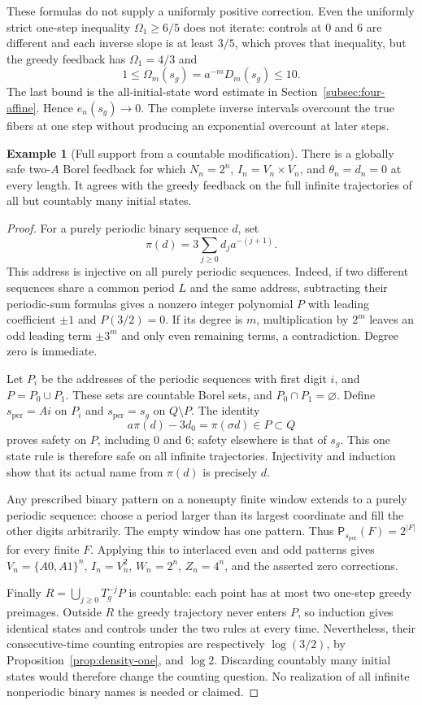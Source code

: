 \documentclass[11pt,reqno]{amsart}
\numberwithin{equation}{section}
\theoremstyle{definition}
\newtheorem{example}[theorem]{Example}
\theoremstyle{definition}
\newcommand{\Patt}{\mathsf P}
\begin{document}
These formulas do not supply a uniformly positive correction.
Even the uniformly strict one-step inequality
$\Omega_1\ge6/5$ does not iterate: controls at $0$ and $6$
are different and each inverse slope is at least $3/5$, which
proves that inequality, but the greedy feedback has
$\Omega_1=4/3$ and
\[
 1\le\Omega_m(s_g)=a^{-m}D_m(s_g)\le10.
\]
The last bound is the all-initial-state word estimate in
Section~\ref{subsec:four-affine}. Hence $e_n(s_g)\to0$.
The complete inverse intervals overcount the true fibers at one
step without producing an exponential overcount at later steps.

\begin{example}[Full support from a countable modification]
\label{ex:periodic-support}
There is a globally safe two-$A$ Borel feedback for which
$N_n=2^n$, $I_n=V_n\times V_n$, and $\theta_n=d_n=0$ at
every length. It agrees with the greedy feedback on the full
infinite trajectories of all but countably many initial states.
\end{example}
\begin{proof}
For a purely periodic binary sequence $d$, set
\[
 \pi(d)=3\sum_{j\ge0}d_ja^{-(j+1)}.
\]
This address is injective on all purely periodic sequences.
Indeed, if two different sequences share a common period $L$
and the same address, subtracting their periodic-sum formulas
gives a nonzero integer polynomial $P$ with leading coefficient
$\pm1$ and $P(3/2)=0$. If its degree is $m$, multiplication by
$2^m$ leaves an odd leading term $\pm3^m$ and only even
remaining terms, a contradiction. Degree zero is immediate.

Let $P_i$ be the addresses of the periodic sequences with first
digit $i$, and $P=P_0\cup P_1$. These sets are countable Borel
sets, and $P_0\cap P_1=\varnothing$. Define $s_{\mathrm{per}}=Ai$
on $P_i$ and $s_{\mathrm{per}}=s_g$ on $Q\setminus P$. The identity
\[
 a\pi(d)-3d_0=\pi(\sigma d)\in P\subset Q
\]
proves safety on $P$, including $0$ and $6$; safety elsewhere
is that of $s_g$. This one state rule is therefore safe on all
infinite trajectories. Injectivity and induction show that its
actual name from $\pi(d)$ is precisely $d$.

Any prescribed binary pattern on a nonempty finite window extends to a
purely periodic sequence: choose a period larger than its largest
coordinate and fill the other digits arbitrarily. The empty window has
one pattern. Thus
$\Patt_{s_{\mathrm{per}}}(F)=2^{|F|}$ for every finite $F$.
Applying this to interlaced even and odd patterns gives
$V_n=\{A0,A1\}^n$, $I_n=V_n^2$, $W_n=2^n$, $Z_n=4^n$,
and the asserted zero corrections.

Finally $R=\bigcup_{j\ge0}T_g^{-j}P$ is countable: each point
has at most two one-step greedy preimages. Outside $R$ the
greedy trajectory never enters $P$, so induction gives identical
states and controls under the two rules at every time. Nevertheless,
their consecutive-time counting entropies are respectively
$\log(3/2)$, by Proposition~\ref{prop:density-one}, and $\log2$.
Discarding countably many initial states would therefore change
the counting question. No realization of all infinite nonperiodic
binary names is needed or claimed.
\end{proof}
\end{document}

